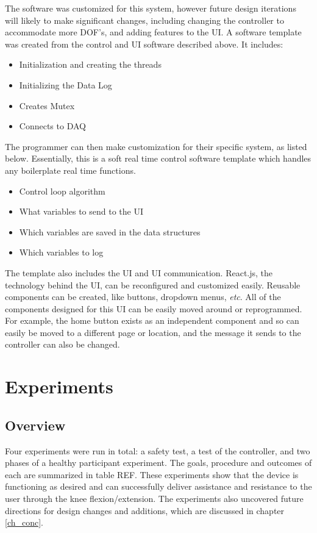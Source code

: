 \documentclass[12pt]{report}
\begin{document}
	The software was customized for this system, however future design iterations will likely to make significant changes, including changing the controller to accommodate more DOF's, and adding features to the UI. A software template was created from the control and UI software described above. It includes:
	
	\begin{itemize}
		\item Initialization and creating the threads
		\item Initializing the Data Log
		\item Creates Mutex
		\item Connects to DAQ
	\end{itemize}
	
	The programmer can then make customization for their specific system, as listed below. Essentially, this is a soft real time control software template which handles any boilerplate real time functions.
	
	\begin{itemize}
		\item Control loop algorithm
		\item What variables to send to the UI
		\item Which variables are saved in the data structures 
		\item Which variables to log 
	\end{itemize}
	
	The template also includes the UI and UI communication. React.js, the technology behind the UI, can be reconfigured and customized easily. Reusable components can be created, like buttons, dropdown menus, \textit{etc}. All of the components designed for this UI can be easily moved around or reprogrammed. For example, the home button exists as an independent component and so can easily be moved to a different page or location, and the message it sends to the controller can also be changed. 
	
\chapter{Experiments}

	\section{Overview}
	
	Four experiments were run in total: a safety test, a test of the controller, and two phases of a healthy participant experiment. The goals, procedure and outcomes of each are summarized in table REF. These experiments show that the device is functioning as desired and can successfully deliver assistance and resistance to the user through the knee flexion/extension. The experiments also uncovered future directions for design changes and additions, which are discussed in chapter \ref{ch_conc}. 
	
\end{document}
